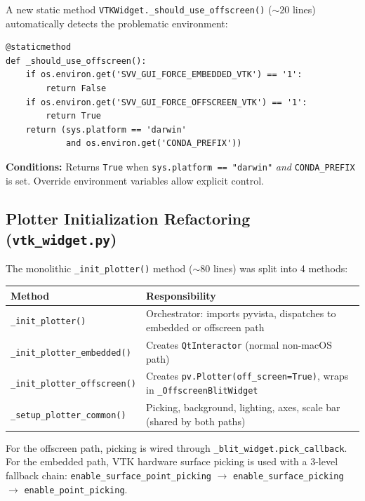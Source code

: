 \documentclass[11pt,a4paper]{article}
\begin{document}
A new static method \texttt{VTKWidget.\_should\_use\_offscreen()} (${\sim}20$ lines) automatically detects the problematic environment:

\begin{lstlisting}
@staticmethod
def _should_use_offscreen():
    if os.environ.get('SVV_GUI_FORCE_EMBEDDED_VTK') == '1':
        return False
    if os.environ.get('SVV_GUI_FORCE_OFFSCREEN_VTK') == '1':
        return True
    return (sys.platform == 'darwin'
            and os.environ.get('CONDA_PREFIX'))
\end{lstlisting}

\textbf{Conditions:} Returns \texttt{True} when \texttt{sys.platform == "darwin"} \emph{and} \texttt{CONDA\_PREFIX} is set. Override environment variables allow explicit control.

\subsection{Plotter Initialization Refactoring (\texttt{vtk\_widget.py})}

The monolithic \texttt{\_init\_plotter()} method (${\sim}80$ lines) was split into 4 methods:

\begin{longtable}{p{4.5cm}p{7.5cm}}
\toprule
\textbf{Method} & \textbf{Responsibility} \\
\midrule
\endhead
\texttt{\_init\_plotter()} & Orchestrator: imports pyvista, dispatches to embedded or offscreen path \\
\texttt{\_init\_plotter\_embedded()} & Creates \texttt{QtInteractor} (normal non-macOS path) \\
\texttt{\_init\_plotter\_offscreen()} & Creates \texttt{pv.Plotter(off\_screen=True)}, wraps in \texttt{\_OffscreenBlitWidget} \\
\texttt{\_setup\_plotter\_common()} & Picking, background, lighting, axes, scale bar (shared by both paths) \\
\bottomrule
\end{longtable}

For the offscreen path, picking is wired through \texttt{\_blit\_widget.pick\_callback}. For the embedded path, VTK hardware surface picking is used with a 3-level fallback chain: \texttt{enable\_surface\_point\_picking} $\to$ \texttt{enable\_surface\_picking} $\to$ \texttt{enable\_point\_picking}.
\end{document}
